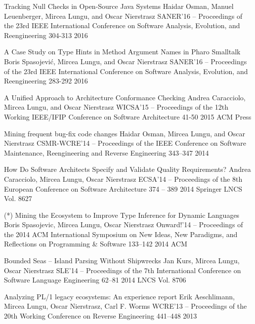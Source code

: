 \begin{enumerate}


\densepap
	{Tracking Null Checks in Open-Source Java Systems}
	{Haidar Osman, Manuel Leuenberger, Mircea Lungu, and Oscar Nierstrasz}
	{SANER'16 -- Proceedings of the 23rd IEEE International Conference on Software Analysis, Evolution, and Reengineering}
	{304-313}
	{2016}
	{\IEEE}

\densepap
	{A Case Study on Type Hints in Method Argument Names in Pharo Smalltalk}
	{Boris Spasojević, Mircea Lungu, and Oscar Nierstrasz}
	{SANER'16 -- Proceedings of the 23rd IEEE International Conference on Software Analysis, Evolution, and Reengineering}
	{283-292} 
	{2016}
	{\IEEE}

\densepap
	{A Unified Approach to Architecture Conformance Checking}
	{Andrea Caracciolo, Mircea Lungu, and Oscar Nierstrasz}
	{WICSA'15 -- Proceedings of the 12th Working IEEE/IFIP Conference on Software Architecture }
	{41-50}
	{2015}
	{ACM Press}

\densepap
	{Mining frequent bug-fix code changes}
	{Haidar Osman, Mircea Lungu, and Oscar Nierstrasz}
	{CSMR-WCRE'14 -- Proceedings of the IEEE Conference on Software Maintenance, Reengineering and Reverse Engineering }
	{343--347}
	{2014}
	{\IEEE}



\densepap
	{How Do Software Architects Specify and Validate Quality Requirements?}
	{Andrea Caracciolo, Mircea Lungu, Oscar Nierstrasz}
	{ECSA'14 -- Proceedings of the 8th European Conference on Software Architecture }
	{374 -- 389}
	{2014}
	{Springer LNCS Vol. 8627}

\densepap
	{(*) Mining the Ecosystem to Improve Type Inference for Dynamic Languages}
	{Boris Spasojevic, Mircea Lungu, Oscar Nierstrasz}
	{Onward!'14 -- Proceedings of the 2014 ACM International Symposium on New Ideas, New Paradigms, and Reflections on Programming \& Software }
	{133--142}
	{2014}
	{ACM}

\densepap
	{Bounded Seas -- Island Parsing Without Shipwrecks}
	{Jan Kurs, Mircea Lungu, Oscar Nierstrasz}
	{SLE'14 -- Proceedings of the 7th International Conference on Software Language Engineering }
	{62--81}
	{2014}
	{LNCS Vol. 8706}

\densepap
	{Analyzing PL/1 legacy ecosystems: An experience report}
	{Erik Aeschlimann, Mircea Lungu, Oscar Nierstrasz, Carl F. Worms}
	{WCRE'13 -- Proceedings of the 20th Working Conference on Reverse  Engineering }
	{441--448}
	{2013}
	{\IEEE}


\end{enumerate}
